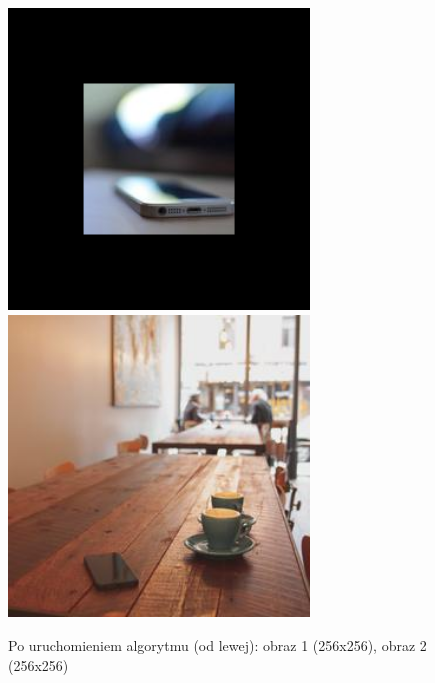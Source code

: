 \documentclass[a4paper,12pt]{book}
\begin{document}
\begin{figure}[H]
	\caption{Po uruchomieniem algorytmu (od lewej): obraz 1 (256x256), obraz 2 (256x256)}
	\includegraphics[width=8cm, height=8cm]{1-3/geometric-color-phone-coffee.png}
	\includegraphics[width=8cm, height=8cm]{1-3/geometric-color-coffee-phone.png}
\end{figure}
\end{document}
